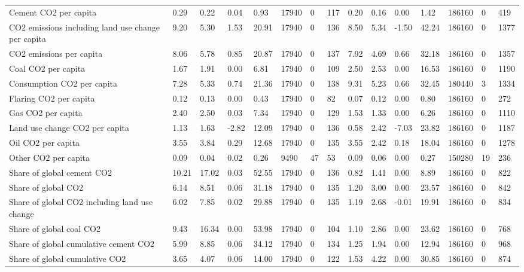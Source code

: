 \begin{longtable}{lllllllllllllll}
Cement CO2 per capita & 0.29 & 0.22 & 0.04 & 0.93 & 17940 & 0 & 117 & 0.20 & 0.16 & 0.00 & 1.42 & 186160 & 0 & 419\\
CO2 emissions including land use change per capita & 9.20 & 5.30 & 1.53 & 20.91 & 17940 & 0 & 136 & 8.50 & 5.34 & -1.50 & 42.24 & 186160 & 0 & 1377\\
CO2 emissions per capita & 8.06 & 5.78 & 0.85 & 20.87 & 17940 & 0 & 137 & 7.92 & 4.69 & 0.66 & 32.18 & 186160 & 0 & 1357\\
Coal CO2 per capita & 1.67 & 1.91 & 0.00 & 6.81 & 17940 & 0 & 109 & 2.50 & 2.53 & 0.00 & 16.53 & 186160 & 0 & 1190\\
\addlinespace
Consumption CO2 per capita & 7.28 & 5.33 & 0.74 & 21.36 & 17940 & 0 & 138 & 9.31 & 5.23 & 0.66 & 32.45 & 180440 & 3 & 1334\\
Flaring CO2 per capita & 0.12 & 0.13 & 0.00 & 0.43 & 17940 & 0 & 82 & 0.07 & 0.12 & 0.00 & 0.80 & 186160 & 0 & 272\\
Gas CO2 per capita & 2.40 & 2.50 & 0.03 & 7.34 & 17940 & 0 & 129 & 1.53 & 1.33 & 0.00 & 6.26 & 186160 & 0 & 1110\\
Land use change CO2 per capita & 1.13 & 1.63 & -2.82 & 12.09 & 17940 & 0 & 136 & 0.58 & 2.42 & -7.03 & 23.82 & 186160 & 0 & 1187\\
Oil CO2 per capita & 3.55 & 3.84 & 0.29 & 12.68 & 17940 & 0 & 135 & 3.55 & 2.42 & 0.18 & 18.04 & 186160 & 0 & 1278\\
\addlinespace
Other CO2 per capita & 0.09 & 0.04 & 0.02 & 0.26 & 9490 & 47 & 53 & 0.09 & 0.06 & 0.00 & 0.27 & 150280 & 19 & 236\\
Share of global cement CO2 & 10.21 & 17.02 & 0.03 & 52.55 & 17940 & 0 & 136 & 0.82 & 1.41 & 0.00 & 8.89 & 186160 & 0 & 822\\
Share of global CO2 & 6.14 & 8.51 & 0.06 & 31.18 & 17940 & 0 & 135 & 1.20 & 3.00 & 0.00 & 23.57 & 186160 & 0 & 842\\
Share of global CO2 including land use change & 6.02 & 7.85 & 0.02 & 29.88 & 17940 & 0 & 135 & 1.19 & 2.68 & -0.01 & 19.91 & 186160 & 0 & 834\\
Share of global coal CO2 & 9.43 & 16.34 & 0.00 & 53.98 & 17940 & 0 & 104 & 1.10 & 2.86 & 0.00 & 23.62 & 186160 & 0 & 768\\
\addlinespace
Share of global cumulative cement CO2 & 5.99 & 8.85 & 0.06 & 34.12 & 17940 & 0 & 134 & 1.25 & 1.94 & 0.00 & 12.94 & 186160 & 0 & 968\\
Share of global cumulative CO2 & 3.65 & 4.07 & 0.06 & 14.00 & 17940 & 0 & 122 & 1.53 & 4.22 & 0.00 & 30.85 & 186160 & 0 & 874\\

\end{longtable}
